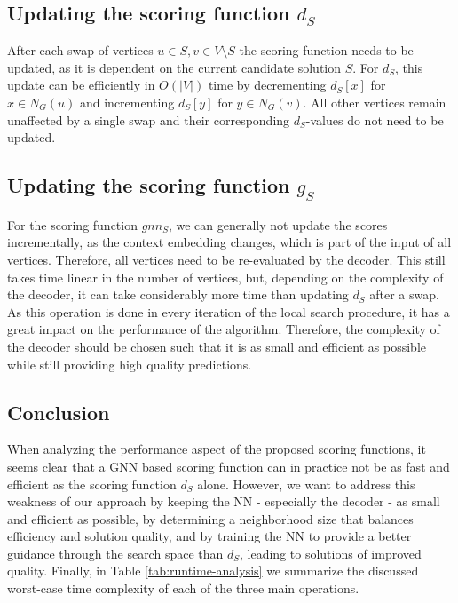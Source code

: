 \documentclass[draft,final]{vutinfth} %
\begin{document}
\subsection{Updating the scoring function $d_S$}
After each swap of vertices $u \in S, v \in V \setminus S$ the scoring function needs to be updated, as it is dependent on the current candidate solution $S$. For $d_S$, this update can be efficiently in $O(|V|)$ time by decrementing $d_S[x]$ for $x \in N_G(u)$ and incrementing $d_S[y]$ for $y \in N_G(v)$. All other vertices remain unaffected by a single swap and their corresponding $d_S$-values do not need to be updated. 

\subsection{Updating the scoring function $g_S$}

For the scoring function $gnn_S$, we can generally not update the scores incrementally, as the context embedding changes, which is part of the input of all vertices. Therefore, all vertices need to be re-evaluated by the decoder. This still takes time linear in the number of vertices, but, depending on the complexity of the decoder, it can take considerably more time than updating $d_S$ after a swap. As this operation is done in every iteration of the local search procedure, it has a great impact on the performance of the algorithm. Therefore, the complexity of the decoder should be chosen such that it is as small and efficient as possible while still providing high quality predictions. 

\subsection{Conclusion}
When analyzing the performance aspect of the proposed scoring functions, it seems clear that a GNN based scoring function can in practice not be as fast and efficient as the scoring function $d_S$ alone. However, we want to address this weakness of our approach by keeping the NN - especially the decoder - as small and efficient as possible, by determining a neighborhood size that balances efficiency and solution quality, and by training the NN to provide a better guidance through the search space than $d_S$, leading to solutions of improved quality. Finally, in Table \ref{tab:runtime-analysis} we summarize the discussed worst-case time complexity of each of the three main operations. 
\end{document}
